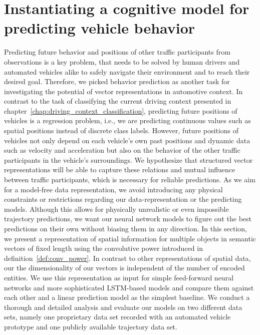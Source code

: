 \chapter{Instantiating a cognitive model for predicting vehicle behavior}
\label{chap:behav_pred}


Predicting future behavior and positions of other traffic participants from observations is a key problem, that needs to be solved by human drivers and automated vehicles alike to safely navigate their environment and to reach their desired goal.
Therefore, we picked behavior prediction as another task for investigating the potential of vector representations in automotive context.
In contrast to the task of classifying the current driving context presented in chapter~\ref{chap:driving_context_classification}, predicting future positions of vehicles is a regression problem, i.e., we are predicting continuous values such as spatial positions instead of discrete class labels.
However, future positions of vehicles not only depend on each vehicle's own past positions and dynamic data such as velocity and acceleration but also on the behavior of the other traffic participants in the vehicle's surroundings.
We hypothesize that structured vector representations will be able to capture these relations and mutual influence between traffic participants, which is necessary for reliable predictions.
As we aim for a model-free data representation, we avoid introducing any physical constraints or restrictions regarding our data-representation or the predicting models.
Although this allows for physically unrealistic or even impossible trajectory predictions, we want our neural network models to figure out the best predictions on their own without biasing them in any direction.
In this section, we present a representation of spatial information for multiple objects in semantic vectors of fixed length using the convolutive power introduced in definition~\ref{def:conv_power}.
In contrast to other representations of spatial data, our the dimensionality of our vectors is independent of the number of encoded entities.
We use this representation as input for simple feed-forward neural networks and more sophisticated \ac{LSTM}-based models and compare them against each other and a linear prediction model as the simplest baseline.
We conduct a thorough and detailed analysis and evaluate our  models on two different data sets, namely one proprietary data set recorded with an automated vehicle prototype and one publicly available trajectory data set.

